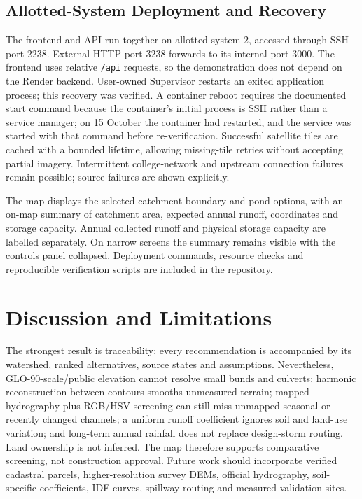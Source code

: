 \documentclass[manuscript,screen,review]{acmart}
\begin{document}
\subsection{Allotted-System Deployment and Recovery}
The frontend and API run together on allotted system 2, accessed through SSH port 2238. External HTTP port 3238 forwards to its internal port 3000. The frontend uses relative \texttt{/api} requests, so the demonstration does not depend on the Render backend. User-owned Supervisor restarts an exited application process; this recovery was verified. A container reboot requires the documented start command because the container's initial process is SSH rather than a service manager; on 15 October the container had restarted, and the service was started with that command before re-verification. Successful satellite tiles are cached with a bounded lifetime, allowing missing-tile retries without accepting partial imagery. Intermittent college-network and upstream connection failures remain possible; source failures are shown explicitly.

The map displays the selected catchment boundary and pond options, with an on-map summary of catchment area, expected annual runoff, coordinates and storage capacity. Annual collected runoff and physical storage capacity are labelled separately. On narrow screens the summary remains visible with the controls panel collapsed. Deployment commands, resource checks and reproducible verification scripts are included in the repository.

\section{Discussion and Limitations}
The strongest result is traceability: every recommendation is accompanied by its watershed, ranked alternatives, source states and assumptions. Nevertheless, GLO-90-scale/public elevation cannot resolve small bunds and culverts; harmonic reconstruction between contours smooths unmeasured terrain; mapped hydrography plus RGB/HSV screening can still miss unmapped seasonal or recently changed channels; a uniform runoff coefficient ignores soil and land-use variation; and long-term annual rainfall does not replace design-storm routing. Land ownership is not inferred. The map therefore supports comparative screening, not construction approval. Future work should incorporate verified cadastral parcels, higher-resolution survey DEMs, official hydrography, soil-specific coefficients, IDF curves, spillway routing and measured validation sites.
\end{document}
